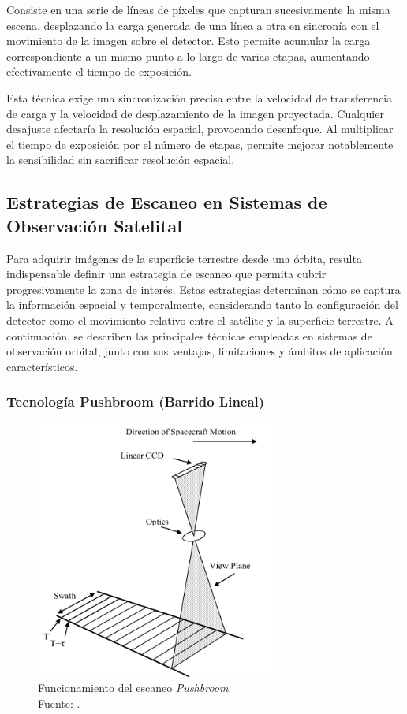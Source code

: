 Consiste en una serie de líneas de píxeles que capturan sucesivamente la misma escena, desplazando la carga generada de una línea a otra en sincronía con el movimiento de la imagen sobre el detector. Esto permite acumular la carga correspondiente a un mismo punto a lo largo de varias etapas, aumentando efectivamente el tiempo de exposición.

Esta técnica exige una sincronización precisa entre la velocidad de transferencia de carga y la velocidad de desplazamiento de la imagen proyectada. Cualquier desajuste afectaría la resolución espacial, provocando desenfoque. Al multiplicar el tiempo de exposición por el número de etapas, permite mejorar notablemente la sensibilidad sin sacrificar resolución espacial.


\subsection{Estrategias de Escaneo en Sistemas de Observación Satelital}

Para adquirir imágenes de la superficie terrestre desde una órbita, resulta indispensable definir una estrategia de escaneo que permita cubrir progresivamente la zona de interés. Estas estrategias determinan cómo se captura la información espacial y temporalmente, considerando tanto la configuración del detector como el movimiento relativo entre el satélite y la superficie terrestre. A continuación, se describen las principales técnicas empleadas en sistemas de observación orbital, junto con sus ventajas, limitaciones y ámbitos de aplicación característicos\cite{design_workshop_optical_2023}.


\subsubsection{Tecnología Pushbroom (Barrido Lineal)}

\begin{figure}[H]
    \centering
    \includegraphics[width=0.7\textwidth]{3.Conceptos_Previos/Pushbroom.png}
    \caption{Funcionamiento del escaneo \textit{Pushbroom}.\\Fuente: \cite{pushbroom_sensor_diagram}.}
    \label{fig:Pushbroom}
\end{figure}



